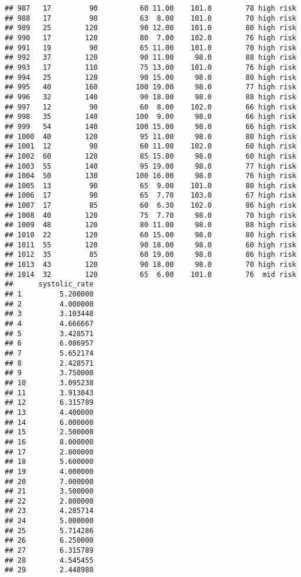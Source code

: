 \documentclass[
  ignorenonframetext,
]{beamer}
\begin{document}
\begin{frame}[fragile]
\begin{verbatim}
## 987   17         90          60 11.00    101.0        78 high risk
## 988   17         90          63  8.00    101.0        70 high risk
## 989   25        120          90 12.00    101.0        80 high risk
## 990   17        120          80  7.00    102.0        76 high risk
## 991   19         90          65 11.00    101.0        70 high risk
## 992   37        120          90 11.00     98.0        88 high risk
## 993   17        110          75 13.00    101.0        76 high risk
## 994   25        120          90 15.00     98.0        80 high risk
## 995   40        160         100 19.00     98.0        77 high risk
## 996   32        140          90 18.00     98.0        88 high risk
## 997   12         90          60  8.00    102.0        66 high risk
## 998   35        140         100  9.00     98.0        66 high risk
## 999   54        140         100 15.00     98.0        66 high risk
## 1000  40        120          95 11.00     98.0        80 high risk
## 1001  12         90          60 11.00    102.0        60 high risk
## 1002  60        120          85 15.00     98.0        60 high risk
## 1003  55        140          95 19.00     98.0        77 high risk
## 1004  50        130         100 16.00     98.0        76 high risk
## 1005  13         90          65  9.00    101.0        80 high risk
## 1006  17         90          65  7.70    103.0        67 high risk
## 1007  17         85          60  6.30    102.0        86 high risk
## 1008  40        120          75  7.70     98.0        70 high risk
## 1009  48        120          80 11.00     98.0        88 high risk
## 1010  22        120          60 15.00     98.0        80 high risk
## 1011  55        120          90 18.00     98.0        60 high risk
## 1012  35         85          60 19.00     98.0        86 high risk
## 1013  43        120          90 18.00     98.0        70 high risk
## 1014  32        120          65  6.00    101.0        76  mid risk
##      systolic_rate
## 1         5.200000
## 2         4.000000
## 3         3.103448
## 4         4.666667
## 5         3.428571
## 6         6.086957
## 7         5.652174
## 8         2.428571
## 9         3.750000
## 10        3.095238
## 11        3.913043
## 12        6.315789
## 13        4.400000
## 14        6.000000
## 15        2.500000
## 16        8.000000
## 17        2.800000
## 18        5.600000
## 19        4.000000
## 20        7.000000
## 21        3.500000
## 22        2.800000
## 23        4.285714
## 24        5.000000
## 25        5.714286
## 26        6.250000
## 27        6.315789
## 28        4.545455
## 29        2.448980

\end{verbatim}
\end{frame}
\end{document}
